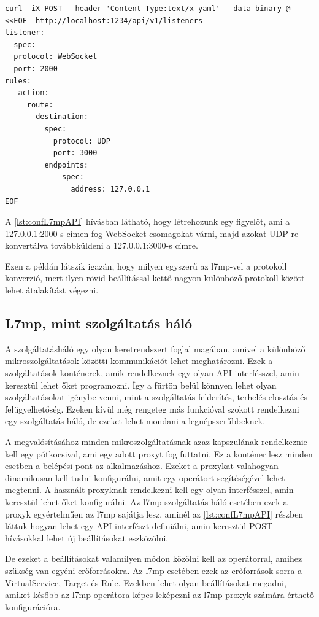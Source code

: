 \begin{lstlisting}[caption=L7mp konfigurálása API-n keresztül, label=lst:confL7mpAPI]
curl -iX POST --header 'Content-Type:text/x-yaml' --data-binary @- <<EOF  http://localhost:1234/api/v1/listeners
listener:
  spec:
  protocol: WebSocket
  port: 2000
rules:
 - action:
     route:
       destination:
         spec:
           protocol: UDP
           port: 3000
         endpoints:
           - spec:
               address: 127.0.0.1
EOF
\end{lstlisting}

A \ref{lst:confL7mpAPI} hívásban látható, hogy létrehozunk egy figyelőt, ami a 127.0.0.1:2000-s
címen fog WebSocket csomagokat várni, majd azokat UDP-re konvertálva továbbküldeni 
a 127.0.0.1:3000-s címre.

Ezen a példán látszik igazán, hogy milyen egyszerű az l7mp-vel a protokoll konverzió,
mert ilyen rövid beállítással kettő nagyon különböző protokoll között lehet 
átalakítást végezni.

\subsection{L7mp, mint szolgáltatás háló}

A szolgáltatásháló egy olyan keretrendszert foglal magában, amivel a különböző 
mikroszolgáltatások közötti kommunikációt lehet meghatározni. Ezek a szolgáltatások 
konténerek, amik rendelkeznek egy olyan API interfésszel, amin keresztül lehet 
őket programozni. Így a fürtön belül könnyen lehet olyan szolgáltatásokat 
igénybe venni, mint a szolgáltatás felderítés, terhelés elosztás és felügyelhetőség.
Ezeken kívül még rengeteg más funkcióval szokott rendelkezni egy szolgáltatás háló,
de ezeket lehet mondani a legnépszerűbbeknek.

A megvalósításához minden mikroszolgáltatásnak azaz kapszulának rendelkeznie kell 
egy pótkocsival, ami egy adott proxyt fog futtatni. Ez a konténer lesz minden esetben
a belépési pont az alkalmazáshoz. Ezeket a proxykat valahogyan dinamikusan kell tudni
konfigurálni, amit egy operátort segítéségével lehet megtenni. A használt proxyknak 
rendelkezni kell egy olyan interfésszel, amin keresztül lehet őket konfigurálni. 
Az l7mp szolgáltatás háló esetében ezek a proxyk egyértelműen az l7mp sajátja lesz,
aminél az \ref{lst:confL7mpAPI} részben láttuk hogyan lehet egy API interfészt definiálni, amin 
keresztül POST hívásokkal lehet új beállításokat eszközölni.

De ezeket a beállításokat valamilyen módon közölni kell az operátorral, amihez 
szükség van egyéni erőforrásokra. Az l7mp esetében ezek az erőforrások sorra a 
VirtualService, Target és Rule. Ezekben lehet olyan beállításokat megadni, amiket
később az l7mp operátora képes leképezni az l7mp proxyk számára érthető konfigurációra.

